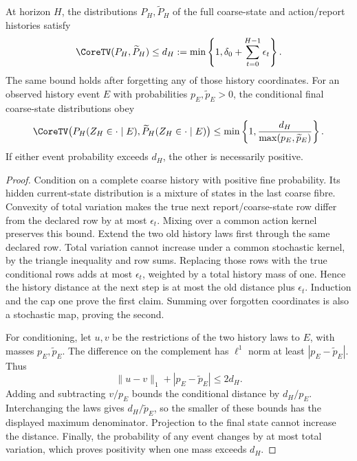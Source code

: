 \begin{Coreproposition}\label{Core:r:history-bound}
At horizon $H$, the distributions $P_H,\widetilde P_H$ of the full coarse-state and action/report histories satisfy
\[
 \CoreTV(P_H,\widetilde P_H)\le d_H:=\min\left\{1,\delta_0+\sum_{t=0}^{H-1}\epsilon_t\right\}.
\]
The same bound holds after forgetting any of those history coordinates. For an observed history event $E$ with probabilities $p_E,\widetilde p_E>0$, the conditional final coarse-state distributions obey
\[
 \CoreTV\bigl(P_H(Z_H\in\cdot\mid E),\widetilde P_H(Z_H\in\cdot\mid E)\bigr)
 \le\min\left\{1,\frac{d_H}{\max(p_E,\widetilde p_E)}\right\}.
\]
If either event probability exceeds $d_H$, the other is necessarily positive.
\end{Coreproposition}
\begin{proof}
Condition on a complete coarse history with positive fine probability. Its hidden current-state distribution is a mixture of states in the last coarse fibre. Convexity of total variation makes the true next report/coarse-state row differ from the declared row by at most $\epsilon_t$. Mixing over a common action kernel preserves this bound. Extend the two old history laws first through the same declared row. Total variation cannot increase under a common stochastic kernel, by the triangle inequality and row sums. Replacing those rows with the true conditional rows adds at most $\epsilon_t$, weighted by a total history mass of one. Hence the history distance at the next step is at most the old distance plus $\epsilon_t$. Induction and the cap one prove the first claim. Summing over forgotten coordinates is also a stochastic map, proving the second.

For conditioning, let $u,v$ be the restrictions of the two history laws to $E$, with masses $p_E,\widetilde p_E$. The difference on the complement has $\ell^1$ norm at least $|p_E-\widetilde p_E|$. Thus
\[
 \|u-v\|_1+|p_E-\widetilde p_E|\le2d_H.
\]
Adding and subtracting $v/p_E$ bounds the conditional distance by $d_H/p_E$. Interchanging the laws gives $d_H/\widetilde p_E$, so the smaller of these bounds has the displayed maximum denominator. Projection to the final state cannot increase the distance. Finally, the probability of any event changes by at most total variation, which proves positivity when one mass exceeds $d_H$.
\end{proof}

